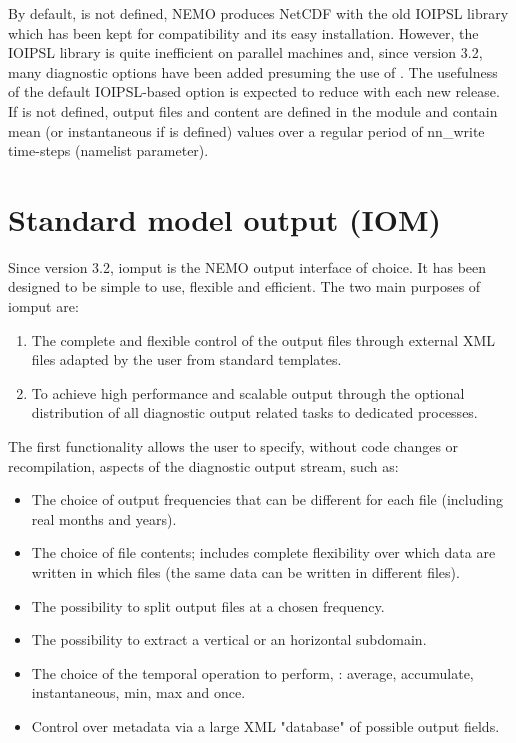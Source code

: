 \documentclass[../main/NEMO_manual]{subfiles}
\begin{document}
By default,  is not defined,
NEMO produces NetCDF with the old IOIPSL library which has been kept for compatibility and its easy installation.
However, the IOIPSL library is quite inefficient on parallel machines and, since version 3.2,
many diagnostic options have been added presuming the use of .
The usefulness of the default IOIPSL-based option is expected to reduce with each new release.
If  is not defined, output files and content are defined in the  module and
contain mean (or instantaneous if  is defined) values over a regular period of
nn\_write time-steps (namelist parameter). 


\section{Standard model output (IOM)}
\label{sec:DIA_iom}

Since version 3.2, iomput is the NEMO output interface of choice.
It has been designed to be simple to use, flexible and efficient.
The two main purposes of iomput are: 

\begin{enumerate}
\item
  The complete and flexible control of the output files through external XML files adapted by
  the user from standard templates.
\item
  To achieve high performance and scalable output through the optional distribution of
  all diagnostic output related tasks to dedicated processes.
\end{enumerate}

The first functionality allows the user to specify, without code changes or recompilation, 
aspects of the diagnostic output stream, such as:

\begin{itemize}
\item
  The choice of output frequencies that can be different for each file (including real months and years).
\item
  The choice of file contents; includes complete flexibility over which data are written in which files
  (the same data can be written in different files).
\item
  The possibility to split output files at a chosen frequency.
\item
  The possibility to extract a vertical or an horizontal subdomain.
\item
  The choice of the temporal operation to perform, \eg: average, accumulate, instantaneous, min, max and once.
\item
  Control over metadata via a large XML "database" of possible output fields.
\end{itemize}
\end{document}
